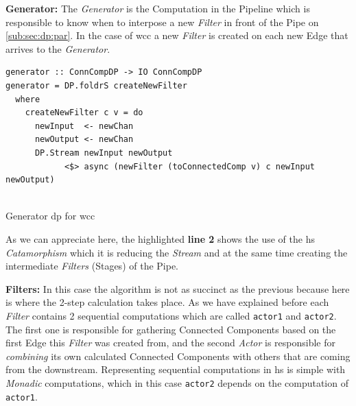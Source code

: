 \documentclass[preprint]{elsarticle}
\begin{document}
\textbf{Generator:}\newline
The \textit{Generator} is the Computation in the Pipeline which is responsible to know when to interpose a new \textit{Filter} in front of the Pipe on \autoref{sub:sec:dp:par}.
In the case of \acrshort{wcc} a new \textit{Filter} is created on each new Edge that arrives to the \textit{Generator}.

\begin{listing}[H]
\begin{verbatim}
generator :: ConnCompDP -> IO ConnCompDP
generator = DP.foldrS createNewFilter
  where
    createNewFilter c v = do
      newInput  <- newChan
      newOutput <- newChan
      DP.Stream newInput newOutput 
            <$> async (newFilter (toConnectedComp v) c newInput newOutput)
  
  \end{verbatim}
  \caption{Generator \acrshort{dp} for \acrshort{wcc}}
  \label{src:haskell:2}
\end{listing}

As we can appreciate here, the highlighted \textbf{line 2} shows the use of the \acrshort{hs} \textit{Catamorphism} which it is reducing the \textit{Stream} and at the same time creating the intermediate \textit{Filters} (Stages) of the Pipe.

\textbf{Filters:}\newline
In this case the algorithm is not as succinct as the previous because here is where the 2-step calculation takes place. As we have explained before each \textit{Filter} contains 2 sequential computations which are called \texttt{actor1} and \texttt{actor2}. The first one is responsible for gathering Connected Components based on the first Edge this \textit{Filter} was created from, and the second \textit{Actor} is responsible for \textit{combining} its own calculated Connected Components with others that are coming from the downstream. Representing sequential computations in \acrshort{hs} is simple with \emph{Monadic} computations, which in this case \texttt{actor2} depends on the computation of \texttt{actor1}.
\end{document}
